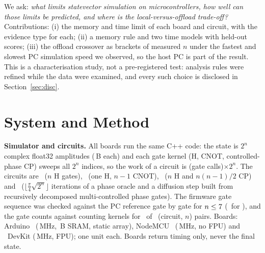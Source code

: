 \documentclass[conference,a4paper,10pt]{IEEEtran}
\begin{document}
We ask: \emph{what limits statevector simulation on microcontrollers, how well can those limits be predicted, and where is the local-versus-offload trade-off?} Contributions: (i) the memory and time limit of each board and circuit, with the evidence type for each; (ii) a memory rule and two time models with held-out scores; (iii) the offload crossover as brackets of measured $n$ under the fastest and slowest PC simulation speed we observed, so the host PC is part of the result. This is a characterisation study, not a pre-registered test: analysis rules were refined while the data were examined, and every such choice is disclosed in Section~\ref{sec:disc}.

\section{System and Method}\label{sec:method}
\textbf{Simulator and circuits.} All boards run the same C++ code: the state is $2^n$ complex float32 amplitudes (\AmpBytes\,B each) and each gate kernel (H, CNOT, controlled-phase CP) sweeps all $2^n$ indices, so the work of a circuit is (gate calls)$\times2^n$. The circuits are \hall\ ($n$ H gates), \bell\ (one H, $n{-}1$ CNOT), \qft\ ($n$ H and $n(n{-}1)/2$ CP) and \grover\ ($\lfloor\frac{\pi}{4}\sqrt{2^n}\rfloor$ iterations of a phase oracle and a diffusion step built from recursively decomposed multi-controlled phase gates). The firmware gate sequence was checked against the PC reference gate by gate for $n\le7$ (\GateSeqGrover\ for \grover), and the gate counts against counting kernels for \GateCrossN\ of \GateCrossAll\ (circuit, $n$) pairs. Boards: Arduino \uno\ (\FcpuUno\,MHz, \MemSramUno\,B SRAM, static array), NodeMCU \espA\ (\FcpuEspLo\,MHz, no FPU) and \espB\ DevKit (\FcpuEspHi\,MHz, FPU); one unit each. Boards return timing only, never the final state.
\end{document}

